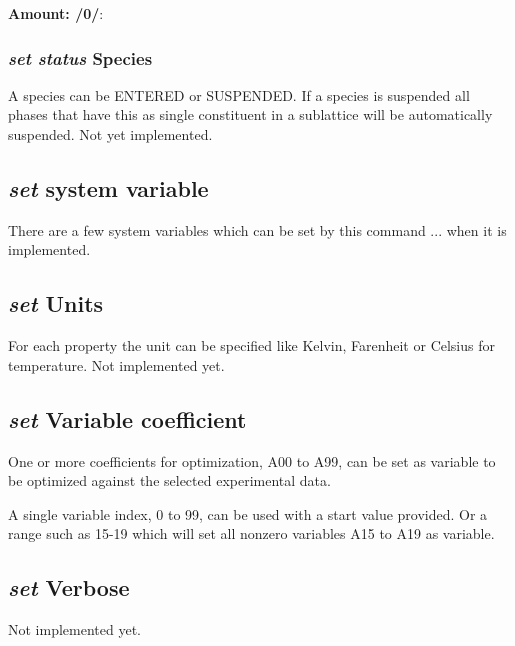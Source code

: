 \documentclass[11pt]{article}
\begin{document}
{\bf Amount: /0/}:

\hypertarget{Set status species}{}
\subsubsection{{\em set status} Species}

A species can be ENTERED or SUSPENDED.  If a species is suspended
all phases that have this as single constituent in a sublattice
will be automatically suspended.  Not yet implemented.

\hypertarget{Set systemvariable}{}
\subsection{{\em set} system variable}

There are a few system variables which can be set by this command
... when it is implemented.

\hypertarget{Set units}{}
\subsection{{\em set} Units}

For each property the unit can be specified like Kelvin, Farenheit or
Celsius for temperature.  Not implemented yet.

\hypertarget{Set variable coeff}{}
\subsection{{\em set} Variable coefficient}\label{sc:setvar}

One or more coefficients for optimization, A00 to A99, can be set as
variable to be optimized against the selected experimental data.

A single variable index, 0 to 99, can be used with a start value
provided.  Or a range such as 15-19 which will set all nonzero
variables A15 to A19 as variable.

\hypertarget{Set verbose}{}
\subsection{{\em set} Verbose}

Not implemented yet.

\hypertarget{Set weight}{}
\end{document}
